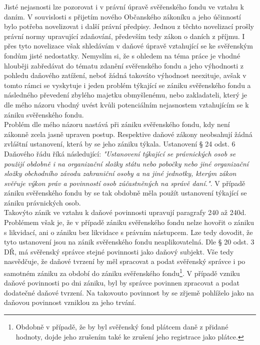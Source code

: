 \documentclass{article}
\begin{document}
Jisté nejasnosti lze pozorovat i v právní úpravě svěřenského fondu ve vztahu k daním. V souvislosti s přijetím nového Občanského zákoníku a jeho účinností bylo potřeba novelizovat i další právní předpisy. Jednou z těchto novelizací prošly právní normy upravující zdaňování, především tedy zákon o daních z příjmu. I přes tyto novelizace však shledávám v daňové úpravě vztahující se ke svěřenským fondům jisté nedostatky. Nemyslím si, že s ohledem na téma práce je vhodné hlouběji zabředávat do tématu zdanění svěřenského fondu a jeho výhodnosti z pohledu daňového zatížení, neboť žádná takováto výhodnost neexituje, avšak v tomto rámci se vyskytuje i jeden problém týkající se zániku svěřenského fondu a následného převedení zbylého majetku obmyšlenému, nebo zakladateli, který je dle mého názoru vhodný uvést kvůli potenciálním nejasnostem vztahujícím se k zániku svěřenského fondu.\\


Problém dle mého názoru nastává při zániku svěřenského fondu, kdy není zákonně zcela jasně upraven postup. Respektive daňové zákony neobsahují žádná zvláštní ustanovení, která by se jeho zániku týkala. Ustanovení § 24 odst. 6 Daňového řádu říká následující: \textit{"Ustanovení týkající se právnických osob se použijí obdobně i na organizační složky státu nebo pobočky nebo jiné organizační složky obchodního závodu zahraniční osoby a na jiné jednotky, kterým zákon svěřuje výkon práv a povinností osob zúčastněných na správě daní."}. V případě zániku svěřenského fondu by se tak obdobně měla použít ustanovení týkající se zániku právnických osob.\\

Takovýto zánik ve vztahu k daňové povinnosti upravují paragrafy 240 až 240d. Problémem však je, že v případě zániku svěřenského fondu nelze hovořit o zániku s likvidací, ani o zániku bez likvidace s právním nástupcem. Lze tedy dovodit, že tyto ustanovení jsou na zánik svěřenského fondu neaplikovatelná. Dle § 20 odst. 3 DŘ, má svěřenský správce stejné povinnosti jako daňový subjekt. Vše tedy nasvědčuje, že daňové tvrzení by měl spracovat a podat svěřenský správce i po samotném zániku za období do zániku svěřenského fondu\footnote{Obdobně v případě, že by byl svěřenský fond plátcem daně z přidané hodnoty, dojde jeho zrušením také ke zrušení jeho registrace jako plátce.}. V případě vzniku daňové povinnosti po dni zániku, byl by správce povinnen zpracovat a podat dodatečné daňové tvrzení. Na takovouto povinnost by se zřjemě pohlíželo jako na daňovou povinnost vzniklou za jeho trvání.\\
\end{document}
